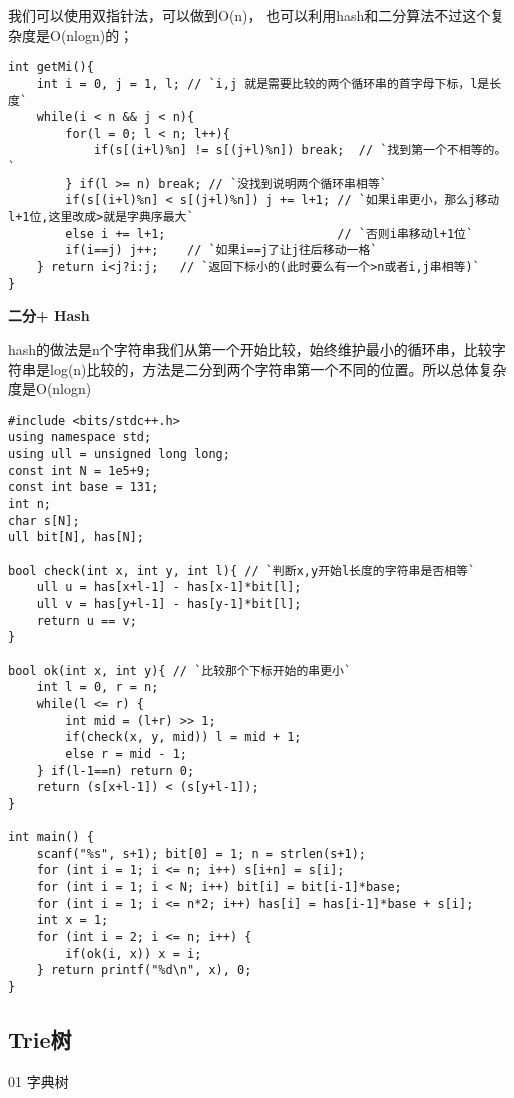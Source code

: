 我们可以使用双指针法，可以做到O(n)， 也可以利用hash和二分算法不过这个复杂度是O(nlogn)的；

\begin{lstlisting}
int getMi(){
    int i = 0, j = 1, l; // `i,j 就是需要比较的两个循环串的首字母下标，l是长度`
    while(i < n && j < n){
        for(l = 0; l < n; l++){
            if(s[(i+l)%n] != s[(j+l)%n]) break;  // `找到第一个不相等的。`
        } if(l >= n) break; // `没找到说明两个循环串相等`
        if(s[(i+l)%n] < s[(j+l)%n]) j += l+1; // `如果i串更小，那么j移动l+1位,这里改成>就是字典序最大`
        else i += l+1;                        // `否则i串移动l+1位`
        if(i==j) j++;    // `如果i==j了让j往后移动一格`
    } return i<j?i:j;   // `返回下标小的(此时要么有一个>n或者i,j串相等)`
}
\end{lstlisting}

{\bfseries 二分+ Hash}

hash的做法是n个字符串我们从第一个开始比较，始终维护最小的循环串，比较字符串是log(n)比较的，方法是二分到两个字符串第一个不同的位置。所以总体复杂度是O(nlogn)

\begin{lstlisting}
#include <bits/stdc++.h>
using namespace std;
using ull = unsigned long long;
const int N = 1e5+9;
const int base = 131;
int n;
char s[N];
ull bit[N], has[N];

bool check(int x, int y, int l){ // `判断x,y开始l长度的字符串是否相等`
    ull u = has[x+l-1] - has[x-1]*bit[l];
    ull v = has[y+l-1] - has[y-1]*bit[l];
    return u == v;
}

bool ok(int x, int y){ // `比较那个下标开始的串更小`
    int l = 0, r = n;
    while(l <= r) {
        int mid = (l+r) >> 1;
        if(check(x, y, mid)) l = mid + 1;
        else r = mid - 1;
    } if(l-1==n) return 0;
    return (s[x+l-1]) < (s[y+l-1]);
}

int main() {
    scanf("%s", s+1); bit[0] = 1; n = strlen(s+1);
    for (int i = 1; i <= n; i++) s[i+n] = s[i];
    for (int i = 1; i < N; i++) bit[i] = bit[i-1]*base;
    for (int i = 1; i <= n*2; i++) has[i] = has[i-1]*base + s[i];
    int x = 1;
    for (int i = 2; i <= n; i++) {
        if(ok(i, x)) x = i;
    } return printf("%d\n", x), 0;
}
\end{lstlisting}


\subsection{Trie树}

01 字典树

